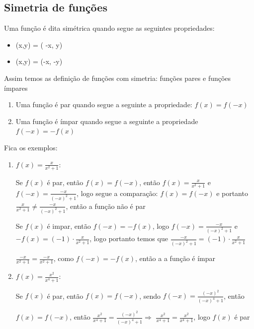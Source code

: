 \begin{multicols*}{2}
    \subsection*{Simetria de funções}
    Uma função é dita simétrica quando segue as seguintes propriedades:
    \begin{itemize}
        \item (x,y) = ( -x, y)
        \item (x,y) = (-x, -y)
    \end{itemize}
    Assim temos as definição de funções com simetria: funções pares e funções ímpares
    \begin{enumerate}[wide, labelwidth=!, labelindent=0pt]
        \item Uma função é par quando segue a seguinte a propriedade: $f(x) = f(-x)$
        \item Uma função é ímpar quando segue a seguinte a propriedade $f(-x) = -f(x)$
    \end{enumerate}
    Fica os exemplos:
    \begin{enumerate}[wide, labelwidth=!, labelindent=0pt]
        \item $	f(x) = \frac{x}{x^2 + 1} $:

              Se $f(x)$ é par, então $f(x) = f(-x)$, então $f(x) = \frac{x}{x^2 +1 }$ e
              $f(-x) = \frac{-x}{(-x)^2 +1}$, logo segue a comparação: $f(x) = f(-x)$ e portanto
              $\frac{x}{x^2 +1 } \ne \frac{ -x}{ (-x)^2 +1}$, então a função não é par

              Se $f(x)$ é impar, então $f(-x) = -f(x)$, logo $f(-x) = \frac{-x}{(-x)^2 +1}$ e
              $-f(x) = (-1) \cdot \frac{x}{x^2 +1}$, logo portanto temos que
              $\frac{-x}{(-x)^2 +1} = (-1) \cdot \frac{x}{x^2 +1} $

              $\frac{-x}{x^2 +1} = \frac{-x}{x^2 +1} $, como $f(-x) = -f(x)$, então a a função é
              ímpar

        \item $f(x) = \frac{x^2}{x^4 +1}$:

              Se $f(x)$ é par, então $f(x) = f(-x)$, sendo $f(-x) = \frac{(-x)^2}{(-x)^4 + 1}$, então

              $f(x) = f(-x)$, então $ \frac{x^2}{x^4 +1} = \frac{(-x)^2}{(-x)^4 + 1} \Rightarrow$
              $\frac{x^2}{x^4 +1} = \frac{x^2}{x^4 + 1}$, logo $f(x)$ é par

    \end{enumerate}


\end{multicols*}
